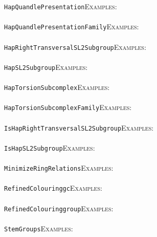 \documentclass[a4paper,11pt]{report}
\begin{document}
{{ \texttt{HapQuandlePresentation}{\nobreakspace}{\nobreakspace}{\nobreakspace}{\nobreakspace}\textsc{Examples:} \\
 \\
 \texttt{HapQuandlePresentationFamily}{\nobreakspace}{\nobreakspace}{\nobreakspace}{\nobreakspace}\textsc{Examples:} \\
 \\
 \texttt{HapRightTransversalSL2Subgroup}{\nobreakspace}{\nobreakspace}{\nobreakspace}{\nobreakspace}\textsc{Examples:} \\
 \\
 \texttt{HapSL2Subgroup}{\nobreakspace}{\nobreakspace}{\nobreakspace}{\nobreakspace}\textsc{Examples:} \\
 \\
 \texttt{HapTorsionSubcomplex}{\nobreakspace}{\nobreakspace}{\nobreakspace}{\nobreakspace}\textsc{Examples:} \\
 \\
 \texttt{HapTorsionSubcomplexFamily}{\nobreakspace}{\nobreakspace}{\nobreakspace}{\nobreakspace}\textsc{Examples:} \\
 \\
 \texttt{IsHapRightTransversalSL2Subgroup}{\nobreakspace}{\nobreakspace}{\nobreakspace}{\nobreakspace}\textsc{Examples:} \\
 \\
 \texttt{IsHapSL2Subgroup}{\nobreakspace}{\nobreakspace}{\nobreakspace}{\nobreakspace}\textsc{Examples:} \\
 \\
 \texttt{MinimizeRingRelations}{\nobreakspace}{\nobreakspace}{\nobreakspace}{\nobreakspace}\textsc{Examples:} \\
 \\
 \texttt{RefinedColouring{\textunderscore}gc}{\nobreakspace}{\nobreakspace}{\nobreakspace}{\nobreakspace}\textsc{Examples:} \\
 \\
 \texttt{RefinedColouring{\textunderscore}group}{\nobreakspace}{\nobreakspace}{\nobreakspace}{\nobreakspace}\textsc{Examples:} \\
 \\
 \texttt{StemGroups}{\nobreakspace}{\nobreakspace}{\nobreakspace}{\nobreakspace}\textsc{Examples:} \\
 \\
}}
\end{document}
